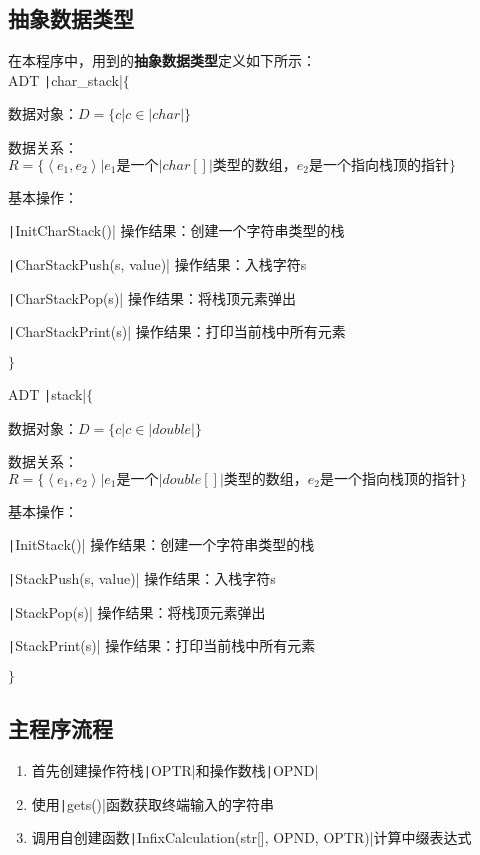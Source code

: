\documentclass[10pt,a4paper]{article}
\begin{document}
	\subsection{抽象数据类型} 
	\noindent 在本程序中，用到的\textbf{抽象数据类型}定义如下所示：\\
	
	\noindent ADT \texttt|char_stack|$\{$
	
	数据对象：$D=\{c | c\in \texttt|char|\}$
	
	数据关系：$R=\{ \left\langle e_1,e_2\right\rangle | e_1\text{是一个}\texttt|char[]|\text{类型的数组，}e_2\text{是一个指向栈顶的指针}\}$
	
	基本操作：
	
	\qquad \texttt|InitCharStack()| 操作结果：创建一个字符串类型的栈
	
	\qquad \texttt|CharStackPush(s, value)| 操作结果：入栈字符s
	
	\qquad \texttt|CharStackPop(s)| 操作结果：将栈顶元素弹出
	
	\qquad \texttt|CharStackPrint(s)| 操作结果：打印当前栈中所有元素
	
	\noindent $\}$
	
	\noindent ADT \texttt|stack|$\{$
	
	数据对象：$D=\{c | c\in \texttt|double|\}$
	
	数据关系：$R=\{ \left\langle e_1,e_2\right\rangle | e_1\text{是一个}\texttt|double[]|\text{类型的数组，}e_2\text{是一个指向栈顶的指针}\}$
	
	基本操作：
	
	\qquad \texttt|InitStack()| 操作结果：创建一个字符串类型的栈
	
	\qquad \texttt|StackPush(s, value)| 操作结果：入栈字符s
	
	\qquad \texttt|StackPop(s)| 操作结果：将栈顶元素弹出
	
	\qquad \texttt|StackPrint(s)| 操作结果：打印当前栈中所有元素
	
	\noindent $\}$
	\subsection{主程序流程}
	\noindent
	\begin{enumerate}
		\item  首先创建操作符栈\texttt|OPTR|和操作数栈\texttt|OPND|
		\item 使用\texttt|gets()|函数获取终端输入的字符串
		\item 调用自创建函数\texttt|InfixCalculation(str[], OPND, OPTR)|计算中缀表达式
	\end{enumerate}
	\newpage
\end{document}
